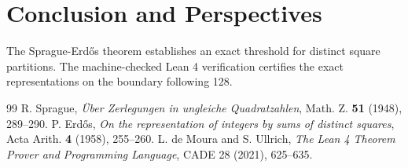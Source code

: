 \documentclass[11pt,a4paper]{article}
\theoremstyle{definition}
\begin{document}
\section{Conclusion and Perspectives}
The Sprague-Erd\H{o}s theorem establishes an exact threshold for distinct square partitions. The machine-checked Lean 4 verification certifies the exact representations on the boundary following 128.

\begin{thebibliography}{99}
 R. Sprague, \textit{\"{U}ber Zerlegungen in ungleiche Quadratzahlen}, Math. Z. \textbf{51} (1948), 289--290.
 P. Erd\H{o}s, \textit{On the representation of integers by sums of distinct squares}, Acta Arith. \textbf{4} (1958), 255--260.
 L. de Moura and S. Ullrich, \textit{The Lean 4 Theorem Prover and Programming Language}, CADE 28 (2021), 625--635.
\end{thebibliography}
\end{document}
